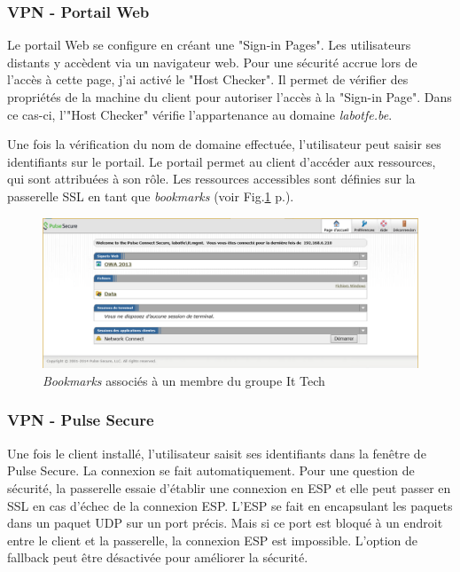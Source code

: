 \subsubsection{VPN - Portail Web}
Le portail Web se configure en créant une "Sign-in Pages".
Les utilisateurs distants y accèdent via un navigateur web.
Pour une sécurité accrue lors de l'accès à cette page, j'ai activé le "Host Checker".
Il permet de vérifier des propriétés de la machine du client pour autoriser l'accès à la "Sign-in Page".
Dans ce cas-ci, l'"Host Checker" vérifie l'appartenance au domaine \textit{labotfe.be}. 

Une fois la vérification du nom de domaine effectuée, l'utilisateur peut saisir ses identifiants sur le portail.
Le portail permet au client d'accéder aux ressources, qui sont attribuées à son rôle.
Les ressources accessibles sont définies sur la passerelle SSL en tant que \textit{bookmarks} (voir Fig.\ref{fig:bookmarks} p.\pageref{fig:bookmarks}).
\begin{figure}[ht]
	\centering
	\includegraphics[width=16cm]{juniper/portail.png}
	\caption{\textit{Bookmarks} associés à un membre du groupe It Tech}
	\label{fig:bookmarks}
\end{figure}

\subsubsection{VPN - Pulse Secure}
Une fois le client installé, l'utilisateur saisit ses identifiants dans la fenêtre de Pulse Secure. 
La connexion se fait automatiquement. 
Pour une question de sécurité, la passerelle essaie d'établir une connexion en ESP et elle peut passer en SSL en cas d'échec de la connexion ESP.
L'ESP se fait en encapsulant les paquets dans un paquet UDP sur un port précis.
Mais si ce port est bloqué à un endroit entre le client et la passerelle, la connexion ESP est impossible.
L'option de fallback peut être désactivée pour améliorer la sécurité. 

